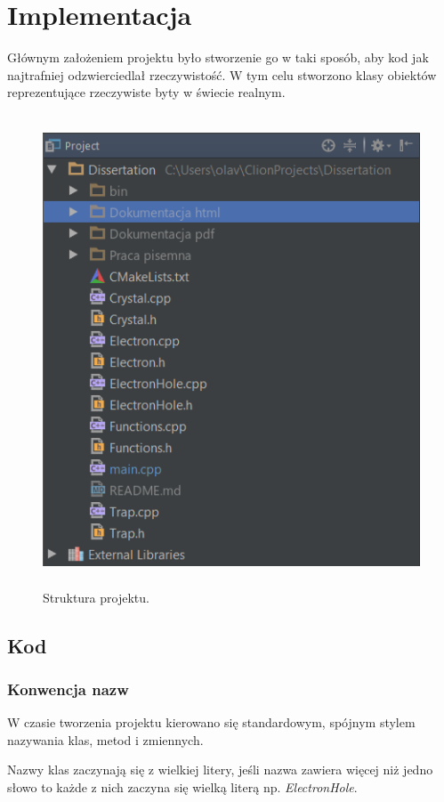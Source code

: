\chapter{Implementacja}

Głównym założeniem projektu było stworzenie go w taki sposób, aby kod jak najtrafniej odzwierciedlał rzeczywistość. W tym celu stworzono klasy obiektów reprezentujące rzeczywiste byty w świecie realnym.
\begin{figure}[H]
\centering
\includegraphics[width=15cm, height=14cm]{strukturaprojektu}
\caption{Struktura projektu.}
\label{fig:Struktura projektu}
\end{figure}

\section{Kod}
\subsection{Konwencja nazw}
W czasie tworzenia projektu kierowano się standardowym, spójnym stylem nazywania klas, metod i zmiennych.
 
Nazwy klas zaczynają się z wielkiej litery, jeśli nazwa zawiera więcej niż jedno słowo to każde z nich zaczyna się wielką literą np. \textit{ElectronHole}. 

